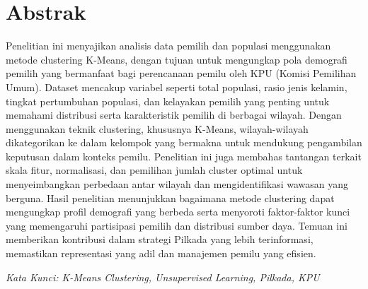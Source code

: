 
\section*{\centering Abstrak}

\setcounter{page}{2}

Penelitian ini menyajikan analisis data pemilih dan populasi menggunakan metode clustering K-Means, dengan tujuan untuk mengungkap pola demografi pemilih yang bermanfaat bagi perencanaan pemilu oleh KPU (Komisi Pemilihan Umum). Dataset mencakup variabel seperti total populasi, rasio jenis kelamin, tingkat pertumbuhan populasi, dan kelayakan pemilih yang penting untuk memahami distribusi serta karakteristik pemilih di berbagai wilayah. Dengan menggunakan teknik clustering, khususnya K-Means, wilayah-wilayah dikategorikan ke dalam kelompok yang bermakna untuk mendukung pengambilan keputusan dalam konteks pemilu. Penelitian ini juga membahas tantangan terkait skala fitur, normalisasi, dan pemilihan jumlah cluster optimal untuk menyeimbangkan perbedaan antar wilayah dan mengidentifikasi wawasan yang berguna. Hasil penelitian menunjukkan bagaimana metode clustering dapat mengungkap profil demografi yang berbeda serta menyoroti faktor-faktor kunci yang memengaruhi partisipasi pemilih dan distribusi sumber daya. Temuan ini memberikan kontribusi dalam strategi Pilkada yang lebih terinformasi, memastikan representasi yang adil dan manajemen pemilu yang efisien.

\vspace{3cm}

\textit{Kata Kunci: K-Means Clustering, Unsupervised Learning, Pilkada, KPU}
\newpage

